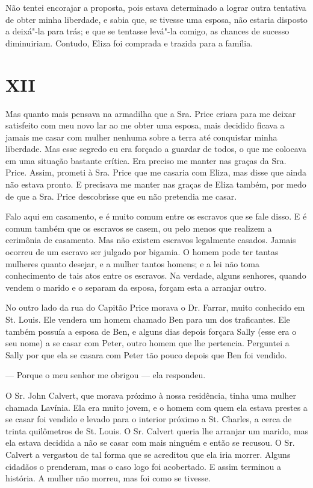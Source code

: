 Não tentei encorajar a proposta, pois estava determinado a lograr outra
tentativa de obter minha liberdade, e sabia que, se tivesse uma esposa,
não estaria disposto a deixá"-la para trás; e que se tentasse levá"-la
comigo, as chances de sucesso diminuiriam. Contudo, Eliza foi comprada e
trazida para a família.

\chapter{XII}

Mas quanto mais pensava na armadilha que a Sra. Price criara para me
deixar satisfeito com meu novo lar ao me obter uma esposa, mais decidido
ficava a jamais me casar com mulher nenhuma sobre a terra até conquistar
minha liberdade. Mas esse segredo eu era forçado a guardar de todos, o \label{ref3}
que me colocava em uma situação bastante crítica. Era preciso me manter
nas graças da Sra. Price. Assim, prometi à Sra. Price que me casaria com
Eliza, mas disse que ainda não estava pronto. E precisava me manter nas
graças de Eliza também, por medo de que a Sra. Price descobrisse que eu
não pretendia me casar.

Falo aqui em casamento, e é muito comum entre os escravos que se fale
disso. E é comum também que os escravos se casem, ou pelo menos que
realizem a cerimônia de casamento. Mas não existem escravos legalmente
casados. Jamais ocorreu de um escravo ser julgado por bigamia. O homem
pode ter tantas mulheres quanto desejar, e a mulher tantos homens; e a
lei não toma conhecimento de tais atos entre os escravos. Na verdade,
alguns senhores, quando vendem o marido e o separam da esposa, forçam
esta a arranjar outro.

No outro lado da rua do Capitão Price morava o Dr. Farrar, muito
conhecido em St. Louis. Ele vendera um homem chamado Ben para um dos
traficantes. Ele também possuía a esposa de Ben, e alguns dias depois
forçara Sally (esse era o seu nome) a se casar com Peter, outro homem
que lhe pertencia. Perguntei a Sally por que ela se casara com Peter tão
pouco depois que Ben foi vendido.

--- Porque o meu senhor me obrigou --- ela respondeu.

O Sr. John Calvert, que morava próximo à nossa residência, tinha uma
mulher chamada Lavínia. Ela era muito jovem, e o homem com quem ela
estava prestes a se casar foi vendido e levado para o interior próximo a
St. Charles, a cerca de trinta quilômetros de St. Louis. O Sr. Calvert
queria lhe arranjar um marido, mas ela estava decidida a não se casar
com mais ninguém e então se recusou. O Sr. Calvert a vergastou de tal
forma que se acreditou que ela iria morrer. Alguns cidadãos o prenderam,
mas o caso logo foi acobertado. E assim terminou a história. A mulher
não morreu, mas foi como se tivesse.

